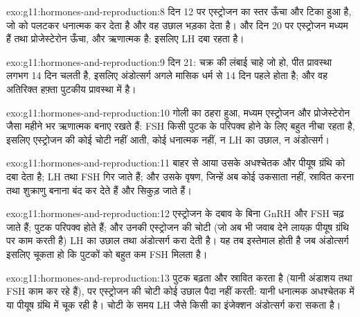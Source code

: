 \begin{solution}{exo:g11:hormones-and-reproduction:8}
दिन 12 पर एस्ट्रोजन का स्तर ऊँचा और टिका हुआ है, जो  को पलटकर
धनात्मक कर देता है और वह उछाल भड़का देता है। और दिन 20 पर एस्ट्रोजन मध्यम
हैं तथा प्रोजेस्टेरोन ऊँचा, और  ऋणात्मक है: इसलिए LH दबा रहता
है।
\end{solution}

\begin{solution}{exo:g11:hormones-and-reproduction:9}
दिन 21: चक्र की लंबाई चाहे जो हो, पीत प्रावस्था लगभग 14 दिन चलती है, इसलिए
अंडोत्सर्ग अगले मासिक धर्म से 14 दिन पहले होता है; और वह अतिरिक्त हफ़्ता
पुटकीय प्रावस्था में है।
\end{solution}

\begin{solution}{exo:g11:hormones-and-reproduction:10}
गोली का ठहरा हुआ, मध्यम एस्ट्रोजन और प्रोजेस्टेरोन जैसा  महीने भर
 ऋणात्मक बनाए रखते हैं: FSH किसी पुटक के परिपक्व होने के लिए
बहुत नीचा रहता है, इसलिए एस्ट्रोजन की कोई चोटी नहीं आती, कोई धनात्मक
 नहीं, न LH का उछाल, न अंडोत्सर्ग।
\end{solution}

\begin{solution}{exo:g11:hormones-and-reproduction:11}
बाहर से आया  उसके अधश्चेतक और पीयूष ग्रंथि को दबा देता है; LH
तथा FSH गिर जाते हैं; और उसके वृषण, जिन्हें अब कोई उकसाता नहीं, स्रावित
करना तथा शुक्राणु बनाना बंद कर देते हैं और सिकुड़ जाते हैं।
\end{solution}

\begin{solution}{exo:g11:hormones-and-reproduction:12}
एस्ट्रोजन के दबाव के बिना GnRH और FSH चढ़ जाते हैं; पुटक परिपक्व होते हैं;
और उनकी एस्ट्रोजन की चोटी (जो अब भी जवाब देने लायक़ पीयूष ग्रंथि पर काम
करती है) LH का उछाल तथा अंडोत्सर्ग करा देती है। यह तब इस्तेमाल होती है जब
अंडोत्सर्ग इसलिए चूकता हो कि पुटकों को बहुत कम FSH मिलता है।
\end{solution}

\begin{solution}{exo:g11:hormones-and-reproduction:13}
पुटक बढ़ता और स्रावित करता है (यानी अंडाशय तथा FSH काम कर रहे हैं), पर
एस्ट्रोजन की चोटी कोई उछाल पैदा नहीं करती: यानी धनात्मक 
अधश्चेतक में या पीयूष ग्रंथि में चूक रही है। चोटी के समय LH जैसे किसी
 का इंजेक्शन अंडोत्सर्ग करा सकता है।
\end{solution}


